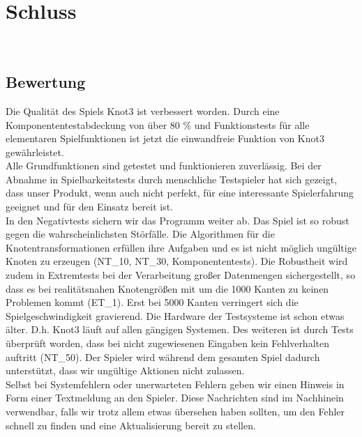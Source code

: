 %



\chapter{Schluss}
\label{Kapitel:Abschluss}

~\\



\section{Bewertung}
\label{Abschnitt:Abschluss:Bewertung}

Die Qualität des Spiels Knot3 ist verbessert worden. Durch eine Komponententestabdeckung von über 80 \% und Funktionstests für alle elementaren Spielfunktionen ist jetzt die einwandfreie Funktion von Knot3 gewährleistet.\\

Alle Grundfunktionen sind getestet und funktionieren zuverlässig. Bei der Abnahme in Spielbarkeitstests durch menschliche Testspieler hat sich gezeigt, dass unser Produkt, wenn auch nicht perfekt, für eine interessante Spielerfahrung geeignet und für den Einsatz bereit ist.\\

In den Negativtests sichern wir das Programm weiter ab. Das Spiel ist so robust gegen die wahrscheinlichsten Störfälle. Die Algorithmen für die Knotentransformationen erfüllen ihre Aufgaben und es ist nicht möglich ungültige Knoten zu erzeugen (NT\_10, NT\_30, Komponententests). Die Robustheit wird zudem in Extremtests bei der Verarbeitung großer Datenmengen sichergestellt, so dass es bei realitätsnahen Knotengrößen mit um die 1000 Kanten zu keinen Problemen kommt (ET\_1). Erst bei 5000 Kanten verringert sich die Spielgeschwindigkeit gravierend. Die Hardware der Testsysteme ist schon etwas älter. D.h. Knot3 läuft auf allen gängigen Systemen. Des weiteren ist durch Tests überprüft worden, dass bei nicht zugewiesenen Eingaben kein Fehlverhalten auftritt (NT\_50). Der Spieler wird während dem gesamten Spiel dadurch unterstützt, dass wir ungültige Aktionen nicht zulassen.\\

Selbst bei Systemfehlern oder unerwarteten Fehlern geben wir einen Hinweis in Form einer Textmeldung an den Spieler. Diese Nachrichten sind im Nachhinein verwendbar, falls wir trotz allem etwas übersehen haben sollten, um den Fehler schnell zu finden und eine Aktualisierung bereit zu stellen.\\

